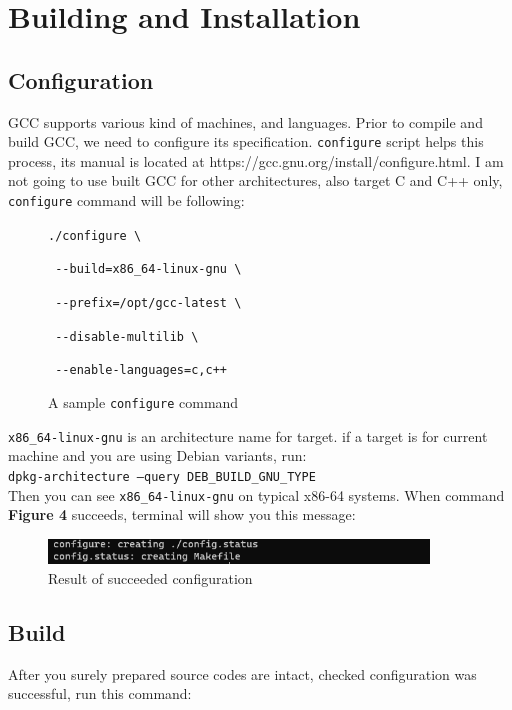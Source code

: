 \documentclass{article}
\begin{document}
\section{Building and Installation}
\subsection{Configuration}
GCC supports various kind of machines, and languages. Prior to compile and build GCC, 
we need to configure its specification. \texttt{configure} script helps this process,
its manual is located at https://gcc.gnu.org/install/configure.html. I am not going to
use built GCC for other architectures, also target C and C++ only, \texttt{configure}
command will be following:\\

\begin{figure}[!htbp]
    \texttt{./configure                  \textbackslash}

    \texttt{    -{}-build=x86\_64-linux-gnu \textbackslash}

    \texttt{    -{}-prefix=/opt/gcc-latest \textbackslash}

    \texttt{    -{}-disable-multilib       \textbackslash}

    \texttt{    -{}-enable-languages=c,c++}
    \caption{A sample \texttt{configure} command}
\end{figure}

\texttt{x86\_64-linux-gnu} is an architecture name for target. if a target is for current machine
and you are using Debian variants, run:\\

\texttt{dpkg-architecture --query DEB\_BUILD\_GNU\_TYPE}\\

Then you can see \texttt{x86\_64-linux-gnu} on typical x86-64 systems. When command 
\textbf{Figure 4} succeeds, terminal will show you this message:

\begin{figure}[!htbp]
    \centering
    \includegraphics[width=0.9\textwidth]{images/4.png}
    \caption{Result of succeeded configuration}
\end{figure}

\subsection{Build}
After you surely prepared source codes are intact, checked configuration was successful, run this command:\\
\end{document}
